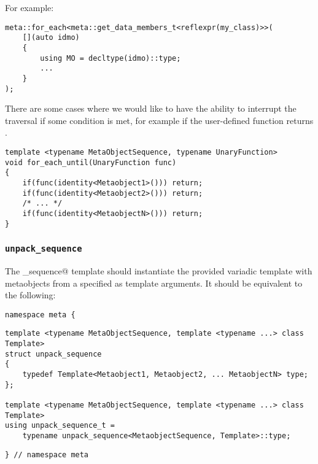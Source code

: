 For example:

\begin{verbatim}
meta::for_each<meta::get_data_members_t<reflexpr(my_class)>>(
	[](auto idmo)
	{
		using MO = decltype(idmo)::type;
		...
	}
);
\end{verbatim}

There are some cases where we would like to have the ability to interrupt
the traversal if some condition is met, for example if the user-defined
function returns \verb@true@.

\begin{verbatim}
template <typename MetaObjectSequence, typename UnaryFunction>
void for_each_until(UnaryFunction func)
{
	if(func(identity<Metaobject1>())) return;
	if(func(identity<Metaobject2>())) return;
	/* ... */
	if(func(identity<MetaobjectN>())) return;
}
\end{verbatim}

\subsubsection{\texttt{unpack\_sequence}}

The \verb@unpack_sequence@ template should instantiate the provided variadic
template with metaobjects from a specified  as template
arguments. It should be equivalent to the following:

\begin{verbatim}
namespace meta {
\end{verbatim}
\begin{verbatim}
template <typename MetaObjectSequence, template <typename ...> class Template>
struct unpack_sequence
{
	typedef Template<Metaobject1, Metaobject2, ... MetaobjectN> type;
};

template <typename MetaObjectSequence, template <typename ...> class Template>
using unpack_sequence_t =
	typename unpack_sequence<MetaobjectSequence, Template>::type;
\end{verbatim}
\begin{verbatim}
} // namespace meta
\end{verbatim}

